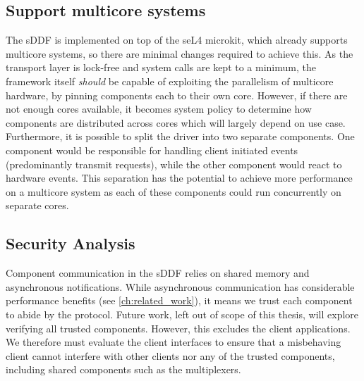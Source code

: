 \subsection{Support multicore systems}\label{s:multicore}
The sDDF is implemented on top of the seL4 microkit, which already supports multicore systems, so there are minimal changes required
to achieve this. As the transport layer is lock-free and system calls are kept to a minimum, the framework itself 
\emph{should} be capable of exploiting the parallelism of multicore hardware, by pinning components each to their 
own core. However, if there are not enough cores available, it becomes system policy to determine how components are distributed
across cores which will largely depend on use case.\\
Furthermore, it is possible to split the driver into two separate components. One component would be responsible for
handling client initiated events (predominantly transmit requests), while the other component would react to 
hardware events. This separation has the potential to achieve more performance on a multicore system as
each of these components could run concurrently on separate cores.\\


\subsection{Security Analysis}\label{s:security}
Component communication in the sDDF relies on shared memory and asynchronous notifications. While asynchronous communication
has considerable performance benefits (see \autoref{ch:related_work}), it means we trust each component to abide by the protocol. 
Future work, left out of scope of this thesis, will explore verifying all trusted components. However, this excludes the client
applications. We therefore must evaluate the client interfaces to ensure that a misbehaving client cannot interfere with other clients
nor any of the trusted components, including shared components such as the multiplexers. 

